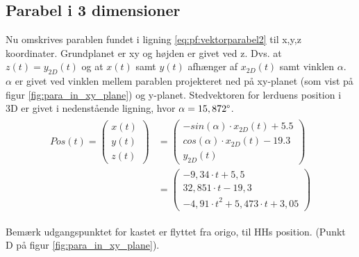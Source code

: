 \subsection{Parabel i 3 dimensioner}
\label{subsubsec:para}
Nu omskrives parablen fundet i ligning \ref{eq:pf:vektorparabel2} til x,y,z koordinater. 
Grundplanet er xy og højden er givet ved z. Dvs. at \(z(t) = y_{2D}(t)\) og at \(x(t)\) samt \(y(t)\) afhænger af \(x_{2D}(t)\) samt vinklen \(\alpha\). 
\(\alpha\) er givet ved vinklen mellem parablen projekteret ned på xy-planet (som vist på figur \ref{fig:para_in_xy_plane}) og y-planet.
Stedvektoren for lerduens position i 3D er givet i nedenstående ligning, hvor \(\alpha = 15,872\degree\).
\begin{align}
\begin{split}
Pos\left( t \right) = 
\left( \begin{matrix} x\left( t \right)  \\
 y\left( t \right)  \\ 
 z\left( t \right)  \end{matrix} \right) &=
 \left( \begin{matrix} - sin\left( \alpha  \right) \cdot { x }_{ 2D }\left( t \right) + 5.5 \\
 cos\left( \alpha  \right) \cdot { x }_{ 2D }\left( t \right) - 19.3  \\
  { y }_{ 2D }\left( t \right)  \end{matrix} \right)
\\
&= \left( \begin{matrix} - 9,34\cdot t+5,5 \\
  32,851\cdot t-19,3 \\ 
 -{ 4,91\cdot t }^{ 2 }+5,473\cdot t+3,05\end{matrix} \right) 
\label{eq:pf:vektorparabel3d}
\end{split}
\end{align}




Bemærk udgangspunktet for kastet er flyttet fra origo, til HHs position. (Punkt D på figur \ref{fig:para_in_xy_plane}).
